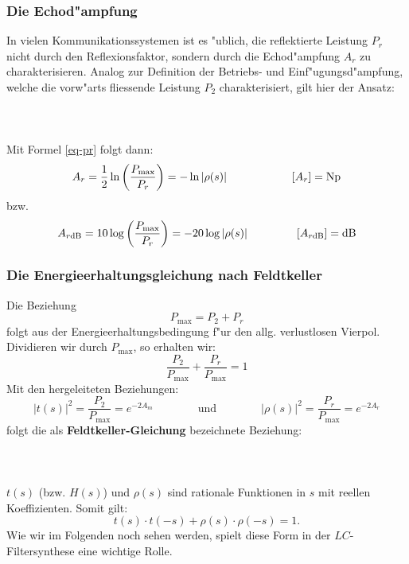 \subsubsection{Die Echod"ampfung}
In vielen Kommunikationssystemen ist es "ublich, die reflektierte
Leistung $P_r$ nicht durch den Reflexionsfaktor, sondern durch die
Echod"ampfung $A_r$ zu charakterisieren.  Analog zur Definition der
Betriebs- und Einf"ugungsd"ampfung, welche die vorw"arts fliessende
Leistung $P_2$ charakterisiert, gilt hier der Ansatz:\\~~\\
\\~~\\
Mit Formel \ref{eq-pr} folgt dann:
\begin{equation}
A_r=\frac{1}{2} \ln{\left(\frac{P_{\max}}{P_r}\right)}=- \ln{ | \rho(s) | } \hspace*{2cm}
  \left[ A_r \right]={\rm Np}
\end{equation}
\nit bzw.
\[
A_{r\text{dB}}=10 \log{\left(\frac{P_{\max}}{P_r}\right)}=-20 \log{ | \rho(s) | } \hspace*{1.5cm}
  \left[ A_{r\text{dB}} \right]={\rm dB}
\]
\subsubsection{Die Energieerhaltungsgleichung nach Feldtkeller}
Die Beziehung
\begin{equation*}
P_{\max}=P_2 + P_r
\end{equation*}
folgt aus der Energieerhaltungsbedingung f"ur den allg. verlustlosen Vierpol.
Dividieren wir durch $P_{\max}$, so erhalten wir:
\begin{equation}
\frac{P_2}{P_{\max}} + \frac{P_r}{P_{\max}}=1
\end{equation}
Mit den hergeleiteten Beziehungen:
\begin{equation*}
\left| t(s) \right|^2=\frac{P_2}{P_{\max}}=e^{-2 A_m}\qquad\qquad\text{und}\qquad\qquad\left|\rho(s)\right|^2=\frac{P_r}{P_{\max}}=e^{-2 A_r}
\end{equation*}
folgt die als {\bf Feldtkeller-Gleichung} bezeichnete Beziehung:\\~~\\
\\~~\\
$t(s)$ (bzw. $H(s)$) und $\rho (s)$ sind rationale Funktionen in $s$ mit
reellen Koeffizienten. Somit gilt:
\begin{equation}
t(s) \cdot t(-s) + \rho(s) \cdot \rho(-s)=1.
\end{equation}
Wie wir im Folgenden noch sehen werden, spielt diese Form in der 
$LC$-Filtersynthese eine wichtige Rolle.

